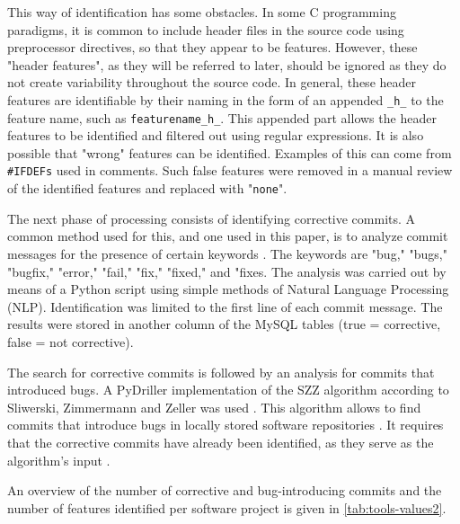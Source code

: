 This way of identification has some obstacles. In some C programming paradigms, it is common to include header files in the source code using preprocessor directives, so that they appear to be features. However, these "header features", as they will be referred to later, should be ignored as they do not create variability throughout the source code. In general, these header features are identifiable by their naming in the form of an appended \texttt{\_h\_} to the feature name, such as \texttt{featurename\_h\_}. This appended part allows the header features to be identified and filtered out using regular expressions. It is also possible that "wrong" features can be identified. Examples of this can come from \texttt{\#IFDEFs} used in comments. Such false features were removed in a manual review of the identified features and replaced with "\texttt{none}".

The next phase of processing consists of identifying corrective commits. A common method used for this, and one used in this paper, is to analyze commit messages for the presence of certain keywords \cite{Zimmermann2007}. The keywords are "bug," "bugs," "bugfix," "error," "fail," "fix," "fixed," and "fixes. The analysis was carried out by means of a Python script using simple methods of Natural Language Processing (NLP). Identification was limited to the first line of each commit message. The results were stored in another column of the MySQL tables (true = corrective, false = not corrective).

The search for corrective commits is followed by an analysis for commits that introduced bugs. A PyDriller implementation of the SZZ algorithm according to Sliwerski, Zimmermann and Zeller was used \cite{Sliwerski2005,Spadini2018}. This algorithm allows to find commits that introduce bugs in locally stored software repositories \cite{Borg2019}. It requires that the corrective commits have already been identified, as they serve as the algorithm's input \cite{Borg2019}.

An overview of the number of corrective and bug-introducing commits and the number of features identified per software project is given in \autoref{tab:tools-values2}.

